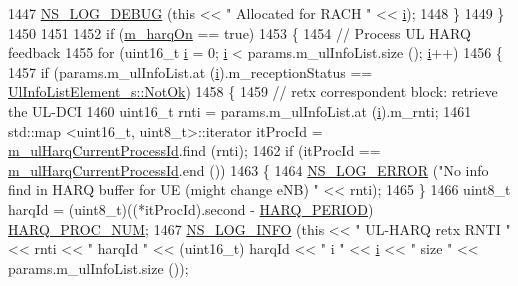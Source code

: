 \begin{DoxyCode}
1447           \hyperlink{group__logging_ga413f1886406d49f59a6a0a89b77b4d0a}{NS\_LOG\_DEBUG} (\textcolor{keyword}{this} << \textcolor{stringliteral}{" Allocated for RACH "} << \hyperlink{bernuolliDistribution_8m_a6f6ccfcf58b31cb6412107d9d5281426}{i});
1448         \}
1449     \}
1450 
1451 
1452   \textcolor{keywordflow}{if} (\hyperlink{classns3_1_1FdBetFfMacScheduler_a37792b61da166e932f6697569d19a479}{m\_harqOn} == \textcolor{keyword}{true})
1453     \{
1454       \textcolor{comment}{//   Process UL HARQ feedback}
1455       \textcolor{keywordflow}{for} (uint16\_t \hyperlink{bernuolliDistribution_8m_a6f6ccfcf58b31cb6412107d9d5281426}{i} = 0; \hyperlink{bernuolliDistribution_8m_a6f6ccfcf58b31cb6412107d9d5281426}{i} < params.m\_ulInfoList.size (); \hyperlink{bernuolliDistribution_8m_a6f6ccfcf58b31cb6412107d9d5281426}{i}++)
1456         \{
1457           \textcolor{keywordflow}{if} (params.m\_ulInfoList.at (\hyperlink{bernuolliDistribution_8m_a6f6ccfcf58b31cb6412107d9d5281426}{i}).m\_receptionStatus == 
      \hyperlink{structns3_1_1UlInfoListElement__s_a2a4dff5145d25c81086660e991db6f61a98aed738fd24811d3461668e394a53c8}{UlInfoListElement\_s::NotOk})
1458             \{
1459               \textcolor{comment}{// retx correspondent block: retrieve the UL-DCI}
1460               uint16\_t rnti = params.m\_ulInfoList.at (\hyperlink{bernuolliDistribution_8m_a6f6ccfcf58b31cb6412107d9d5281426}{i}).m\_rnti;
1461               std::map <uint16\_t, uint8\_t>::iterator itProcId = 
      \hyperlink{classns3_1_1FdBetFfMacScheduler_a12a5dedfa74cd590624828dcffafa855}{m\_ulHarqCurrentProcessId}.find (rnti);
1462               \textcolor{keywordflow}{if} (itProcId == \hyperlink{classns3_1_1FdBetFfMacScheduler_a12a5dedfa74cd590624828dcffafa855}{m\_ulHarqCurrentProcessId}.end ())
1463                 \{
1464                   \hyperlink{group__logging_ga0261a8db1d4ac5f79417d117634fd455}{NS\_LOG\_ERROR} (\textcolor{stringliteral}{"No info find in HARQ buffer for UE (might change eNB) "} << 
      rnti);
1465                 \}
1466               uint8\_t harqId = (uint8\_t)((*itProcId).second - \hyperlink{lte-common_8h_a275321ee206f130c3ddc81fcdaa13cfd}{HARQ\_PERIOD}) %
      \hyperlink{cqa-ff-mac-scheduler_8h_a9185d8d7d2b2979181d4a7044a3d3555}{HARQ\_PROC\_NUM};
1467               \hyperlink{group__logging_gafbd73ee2cf9f26b319f49086d8e860fb}{NS\_LOG\_INFO} (\textcolor{keyword}{this} << \textcolor{stringliteral}{" UL-HARQ retx RNTI "} << rnti << \textcolor{stringliteral}{" harqId "} << (uint16\_t)
      harqId << \textcolor{stringliteral}{" i "} << \hyperlink{bernuolliDistribution_8m_a6f6ccfcf58b31cb6412107d9d5281426}{i} << \textcolor{stringliteral}{" size "}  << params.m\_ulInfoList.size ());

\end{DoxyCode}
